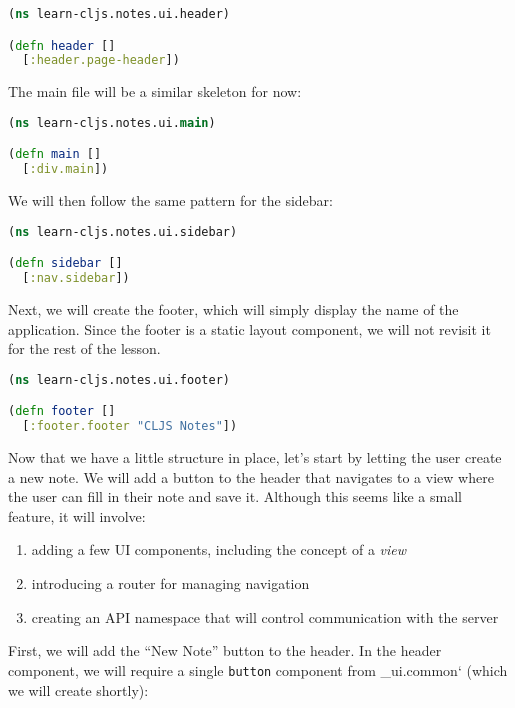 \documentclass[10pt,twoside,openright]{memoir}
\begin{document}
\begin{lstlisting}[language=Clojure, caption={notes/ui/header.cljs}]
(ns learn-cljs.notes.ui.header)

(defn header []
  [:header.page-header])
\end{lstlisting}

The main file will be a similar skeleton for now:

\begin{lstlisting}[language=Clojure, caption={notes/ui/main.cljs}]
(ns learn-cljs.notes.ui.main)

(defn main []
  [:div.main])
\end{lstlisting}

We will then follow the same pattern for the sidebar:

\begin{lstlisting}[language=Clojure, caption={notes/ui/sidebar.cljs}]
(ns learn-cljs.notes.ui.sidebar)

(defn sidebar []
  [:nav.sidebar])
\end{lstlisting}

Next, we will create the footer, which will simply display the name of
the application. Since the footer is a static layout component, we will
not revisit it for the rest of the lesson.

\begin{lstlisting}[language=Clojure, caption={notes/ui/footer.cljs}]
(ns learn-cljs.notes.ui.footer)

(defn footer []
  [:footer.footer "CLJS Notes"])
\end{lstlisting}

Now that we have a little structure in place, let's start by letting the
user create a new note. We will add a button to the header that
navigates to a view where the user can fill in their note and save it.
Although this seems like a small feature, it will involve:

\begin{enumerate}
\def\labelenumi{\arabic{enumi}.}
\tightlist
\item
  adding a few UI components, including the concept of a \emph{view}
\item
  introducing a router for managing navigation
\item
  creating an API namespace that will control communication with the
  server
\end{enumerate}

First, we will add the ``New Note'' button to the header. In the header
component, we will require a single \texttt{button} component from
\_ui.common` (which we will create shortly):
\end{document}
